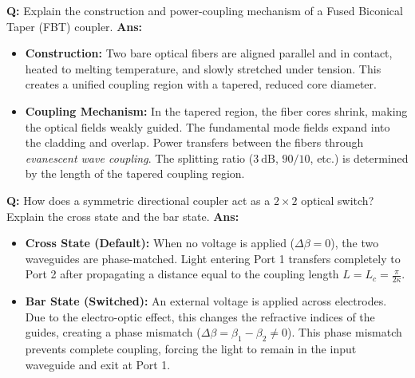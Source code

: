 \documentclass[10pt,a4paper,twocolumn]{article}
\begin{document}
\begin{tcolorbox}[
  colback=white,
  colframe=UnitColorFive,
  colbacktitle=gray!10!white,
  coltitle=black,
  fonttitle=\bfseries\sffamily\small,
  title={Unit V $\bullet$ Card 3: Fused Biconical Taper (FBT) Coupler},
  boxrule=1.2pt,
  arc=2mm,
  outer arc=2mm,
  boxsep=1.5mm,
  top=1mm,
  bottom=1mm,
  left=1.5mm,
  right=1.5mm,
  before skip=2.5mm,
  after skip=2.5mm
]
\textbf{Q:} Explain the construction and power-coupling mechanism of a Fused Biconical Taper (FBT) coupler.
\tcbline
\textbf{Ans:} \begin{itemize}
  \item   \textbf{Construction:} Two bare optical fibers are aligned parallel and in contact, heated to melting temperature, and slowly stretched under tension. This creates a unified coupling region with a tapered, reduced core diameter.
  \item   \textbf{Coupling Mechanism:} In the tapered region, the fiber cores shrink, making the optical fields weakly guided. The fundamental mode fields expand into the cladding and overlap. Power transfers between the fibers through \textit{evanescent wave coupling}. The splitting ratio ($3\ \text{dB}$, $90/10$, etc.) is determined by the length of the tapered coupling region.
\end{itemize}
\end{tcolorbox}


\begin{tcolorbox}[
  colback=white,
  colframe=UnitColorFive,
  colbacktitle=gray!10!white,
  coltitle=black,
  fonttitle=\bfseries\sffamily\small,
  title={Unit V $\bullet$ Card 4: Directional Couplers as Switches},
  boxrule=1.2pt,
  arc=2mm,
  outer arc=2mm,
  boxsep=1.5mm,
  top=1mm,
  bottom=1mm,
  left=1.5mm,
  right=1.5mm,
  before skip=2.5mm,
  after skip=2.5mm
]
\textbf{Q:} How does a symmetric directional coupler act as a $2 \times 2$ optical switch? Explain the cross state and the bar state.
\tcbline
\textbf{Ans:} \begin{itemize}
  \item   \textbf{Cross State (Default):} When no voltage is applied ($\Delta\beta = 0$), the two waveguides are phase-matched. Light entering Port 1 transfers completely to Port 2 after propagating a distance equal to the coupling length $L = L_c = \frac{\pi}{2\kappa}$.
  \item   \textbf{Bar State (Switched):} An external voltage is applied across electrodes. Due to the electro-optic effect, this changes the refractive indices of the guides, creating a phase mismatch ($\Delta\beta = \beta_1 - \beta_2 \neq 0$). This phase mismatch prevents complete coupling, forcing the light to remain in the input waveguide and exit at Port 1.
\end{itemize}
\end{tcolorbox}
\end{document}
